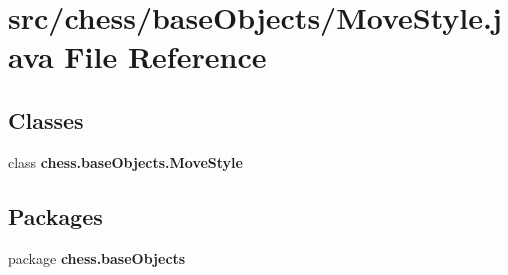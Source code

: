 \section{src/chess/base\+Objects/\+Move\+Style.java File Reference}
\label{_move_style_8java}
\subsection*{Classes}
\begin{DoxyCompactItemize}
\item 
class {\bf chess.\+base\+Objects.\+Move\+Style}
\end{DoxyCompactItemize}
\subsection*{Packages}
\begin{DoxyCompactItemize}
\item 
package {\bf chess.\+base\+Objects}
\end{DoxyCompactItemize}
